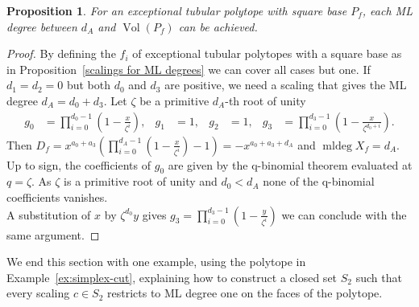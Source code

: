 \documentclass[12pt,reqno]{amsart}   	%
\theoremstyle{plain}
\newtheorem{proposition}[theorem]{Proposition}
\theoremstyle{definition}
\theoremstyle{remark}
\newcommand{\vol}{\operatorname{Vol}}
\newcommand{\mldeg}{\operatorname{mldeg}}
\begin{document}
\begin{proposition}
    For an exceptional tubular polytope with square base $P_f$, each ML degree between $d_A$ and $\vol (P_f)$ can be achieved.
\end{proposition}
\begin{proof}
    By defining the $f_i$ of exceptional tubular polytopes with a square base as in Proposition~\ref{scalings for ML degrees} we can cover all cases but one. If $d_1=d_2=0$ but both $d_0$ and $d_3$ are positive, we need a scaling that gives the ML degree $d_A=d_0+d_3$. Let $\zeta$ be a primitive $d_A$-th root of unity
    \[
    \begin{aligned}
        g_0&=\prod_{i=0}^{d_0-1}\left(1-\frac{x}{\zeta ^i}\right),
        &
        g_1&=1,
        &
        g_2&=1,
        &
        g_3&=\prod_{i=0}^{d_3-1}\left(1-\frac{x}{\zeta ^{d_0+i}} \right).
    \end{aligned}
    \]
    Then $D_f = x^{a_0+a_3}(\prod_{i=0}^{d_A-1} (1-\frac{x}{\zeta ^i}) -1)= -x^{a_0+a_3+d_A}$ and $\mldeg X_f = d_A$. Up to sign, the coefficients of $g_0$ are given by the q-binomial theorem evaluated at $q= \zeta$. As $\zeta$ is a primitive root of unity and $d_0<d_A$ none of the q-binomial coefficients vanishes. \\
    A substitution of $x$ by $\zeta^{d_0}y$ gives $g_3= \prod_{i=0}^{d_3-1}(1-\frac{y}{\zeta ^i})$ we can conclude with the same argument.
\end{proof}
We end this section with one example, using the polytope in Example~\ref{ex:simplex-cut}, explaining how to  construct a  closed set $S_2$ such that every scaling $c\in S_2$ restricts to ML degree one on the faces of the polytope.
\end{document}
